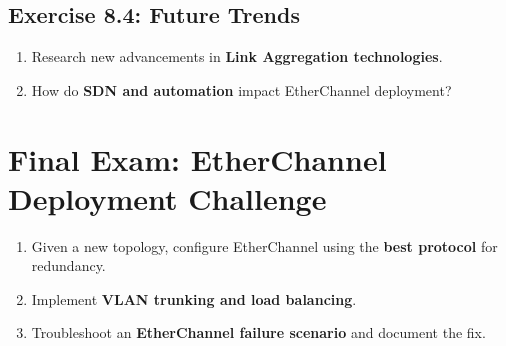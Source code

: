 \documentclass[a4paper]{article}
\begin{document}
\subsection{Exercise 8.4: Future Trends}
\begin{enumerate}
    \item Research new advancements in \textbf{Link Aggregation technologies}.
    \item How do \textbf{SDN and automation} impact EtherChannel deployment?
\end{enumerate}

\section{Final Exam: EtherChannel Deployment Challenge}
\begin{enumerate}
    \item Given a new topology, configure EtherChannel using the \textbf{best protocol} for redundancy.
    \item Implement \textbf{VLAN trunking and load balancing}.
    \item Troubleshoot an \textbf{EtherChannel failure scenario} and document the fix.
\end{enumerate}
\end{document}
